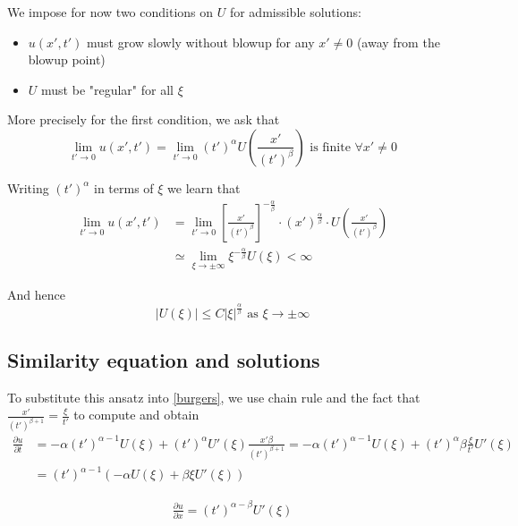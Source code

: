 \documentclass[11pt,a4paper]{article}
\begin{document}
We impose for now two conditions on $U$ for admissible solutions:
\begin{itemize}
    \item $u(x', t')$ must grow slowly without blowup for any $x'\ne 0$ (away from the blowup point)
    \item $U$ must be "regular" for all $\xi$
\end{itemize}

More precisely for the first condition, we ask that
\begin{equation}
    \lim_{t'\to 0} u(x', t') = \lim_{t'\to 0}(t')^\alpha U\left(\frac{x'}{(t')^\beta}\right) \text{ is finite } \forall x'\ne 0
\end{equation}

Writing $(t')^\alpha$ in terms of $\xi$ we learn that 
\begin{align*}
    \lim_{t'\to 0} u(x', t') &= \lim_{t'\to 0} \left[\frac{x'}{(t')^\beta}\right]^{-\frac{\alpha}{\beta}}\cdot (x')^{\frac{\alpha}{\beta}}\cdot U\left(\frac{x'}{(t')^\beta}\right) \\
    &\simeq \lim_{\xi\to\pm\infty} \xi^{-\frac{\alpha}{\beta}} U(\xi) <\infty
\end{align*}

And hence 
\begin{equation}\label{eq:matching-cond}
    \lvert U(\xi)\rvert \le C \lvert \xi\rvert ^{\frac{\alpha}{\beta}} \text{ as } \xi\to\pm\infty
\end{equation}

\subsection{Similarity equation and solutions}

To substitute this ansatz into \eqref{burgers}, we use chain rule and the fact that $\frac{x'}{(t')^{\beta +1}} = \frac{\xi}{t'}$ to compute and obtain
\begin{align*}
    \frac{\partial u}{\partial t} &= -\alpha(t')^{\alpha-1}U(\xi) + (t')^\alpha U'(\xi) \frac{x'\beta}{(t')^{\beta +1}} =-\alpha (t')^{\alpha-1}U(\xi) + (t')^\alpha \beta\frac{\xi}{t'}U'(\xi) \\
    &=(t')^{\alpha-1}(-\alpha U(\xi) + \beta \xi U'(\xi))
\end{align*}

\begin{align*}
    \frac{\partial u}{\partial x}=(t')^{\alpha-\beta}U'(\xi)
\end{align*}
\end{document}
